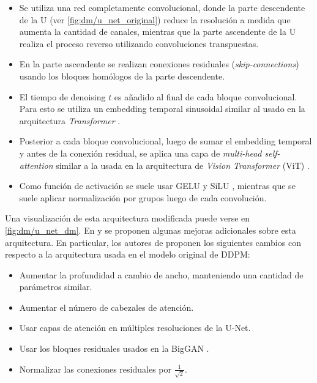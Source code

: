 \begin{itemize}
	\item Se utiliza una red completamente convolucional, donde la parte descendente de la U (ver \autoref{fig:dm/u_net_original}) reduce la resolución a medida que aumenta la cantidad de canales, mientras que la parte ascendente de la U realiza el proceso reverso utilizando convoluciones transpuestas.
	\item En la parte ascendente se realizan conexiones residuales (\textit{skip-connections}) usando los bloques homólogos de la parte descendente.
	\item El tiempo de denoising $t$ es añadido al final de cada bloque convolucional. Para esto se utiliza un embedding temporal sinusoidal similar al usado en la arquitectura \textit{Transformer} \cite{vaswani2023attention}.
	\item Posterior a cada bloque convolucional, luego de sumar el embedding temporal y antes de la conexión residual, se aplica una capa de \textit{multi-head self-attention} similar a la usada en la arquitectura de \textit{Vision Transformer} (ViT) \cite{dosovitskiy2021image}.
	\item Como función de activación se suele usar GELU \cite{hendrycks2023gaussian} y SiLU \cite{elfwing2017sigmoidweighted}, mientras que se suele aplicar normalización por grupos \cite{hafner2018tfdistvae} luego de cada convolución.
\end{itemize}

Una visualización de esta arquitectura modificada puede verse en \autoref{fig:dm/u_net_dm}. En \cite{nichol2021improved} y \cite{dhariwal2021diffusion} se proponen algunas mejoras adicionales sobre esta arquitectura. En particular, los autores de \cite{dhariwal2021diffusion} proponen los siguientes cambios con respecto a la arquitectura usada en el modelo original de DDPM:

\begin{itemize}
	\item Aumentar la profundidad a cambio de ancho, manteniendo una cantidad de parámetros similar.
	\item Aumentar el número de cabezales de atención.
	\item Usar capas de atención en múltiples resoluciones de la U-Net.
	\item Usar los bloques residuales usados en la BigGAN \cite{brock2019largescalegantraining}.
	\item Normalizar las conexiones residuales por $\frac{1}{\sqrt{2}}$.
\end{itemize}

